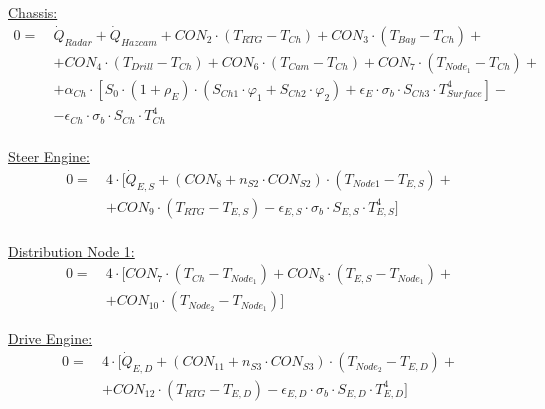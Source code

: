 \underline{Chassis:}
\begin{equation}
	\begin{aligned}
		0=\  &   \dot{Q}_{Radar}+\dot{Q}_{Hazcam}  +CON_2 \cdot (T_{RTG}-T_{Ch})+CON_3 \cdot (T_{Bay}-T_{Ch})+ \\[1em]
		&  +CON_4 \cdot (T_{Drill}-T_{Ch})+ CON_6 \cdot (T_{Cam}-T_{Ch})+CON_7 \cdot (T_{Node_1}-T_{Ch}) +  \\[1em]
		&  + \alpha_{Ch}\cdot [ S_0 \cdot (1+\rho_E) \cdot (S_{Ch1} \cdot \varphi_1  +S_{Ch2} \cdot \varphi_2 ) +   \epsilon_{E} \cdot \sigma_b \cdot S_{Ch3}\cdot T_{Surface}^4 ]-  \\[1em]
		&   -\epsilon_{Ch}\cdot \sigma_b \cdot S_{Ch}\cdot T_{Ch}^4 \\[2em]
	\end{aligned}
\end{equation}

\underline{Steer Engine:}
\begin{equation}
	\begin{aligned}
		0=\  &  4\cdot [\dot{Q}_{E,S} +(CON_8 +n_{S2}\cdot CON_{S2}) \cdot (T_{Node1}-T_{E,S})+ \\[1em]
		&   +CON_9 \cdot (T_{RTG}-T_{E,S}) -\epsilon_{E,S}\cdot \sigma_b \cdot S_{E,S}\cdot T_{E,S}^4] \\[2em]
	\end{aligned}
\end{equation}

\underline{Distribution Node 1:}
\begin{equation}
	\begin{aligned}
		0=\  &  4\cdot [CON_7 \cdot (T_{Ch}-T_{Node_1})+CON_8 \cdot (T_{E,S}-T_{Node_1})+ \\[1em]
		&   +CON_10 \cdot (T_{Node_2}-T_{Node_1})] %
	\end{aligned}
\end{equation}

\underline{Drive Engine:}
\begin{equation}
	\begin{aligned}
		0=\  &  4 \cdot [\dot{Q}_{E,D}+ (CON_{11}+n_{S3}\cdot CON_{S3}) \cdot (T_{Node_2}-T_{E,D})+ \\[1em]
		&  + CON_{12} \cdot (T_{RTG}-T_{E,D})-\epsilon_{E,D}\cdot \sigma_b \cdot S_{E,D}\cdot T_{E,D}^4 ]  %
	\end{aligned}
\end{equation}

